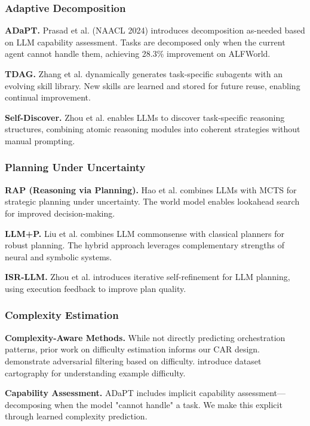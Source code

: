 \documentclass{article}
\theoremstyle{plain}
\theoremstyle{definition}
\theoremstyle{remark}
\begin{document}
\subsubsection{Adaptive Decomposition}

\textbf{ADaPT.} Prasad et al. \citep{prasad2024adapt} (NAACL 2024) introduces decomposition as-needed based on LLM capability assessment. Tasks are decomposed only when the current agent cannot handle them, achieving 28.3\% improvement on ALFWorld.

\textbf{TDAG.} Zhang et al. \citep{zhang2025tdag} dynamically generates task-specific subagents with an evolving skill library. New skills are learned and stored for future reuse, enabling continual improvement.

\textbf{Self-Discover.} Zhou et al. \citep{zhou2024selfdiscover} enables LLMs to discover task-specific reasoning structures, combining atomic reasoning modules into coherent strategies without manual prompting.

\subsubsection{Planning Under Uncertainty}

\textbf{RAP (Reasoning via Planning).} Hao et al. \citep{hao2023rap} combines LLMs with MCTS for strategic planning under uncertainty. The world model enables lookahead search for improved decision-making.

\textbf{LLM+P.} Liu et al. \citep{liu2023llmp} combines LLM commonsense with classical planners for robust planning. The hybrid approach leverages complementary strengths of neural and symbolic systems.

\textbf{ISR-LLM.} Zhou et al. \citep{zhou2024isr} introduces iterative self-refinement for LLM planning, using execution feedback to improve plan quality.

\subsubsection{Complexity Estimation}

\textbf{Complexity-Aware Methods.} While not directly predicting orchestration patterns, prior work on difficulty estimation informs our CAR design. \citet{sakaguchi2021winogrande} demonstrate adversarial filtering based on difficulty. \citet{swayamdipta2020dataset} introduce dataset cartography for understanding example difficulty.

\textbf{Capability Assessment.} ADaPT \citep{prasad2024adapt} includes implicit capability assessment---decomposing when the model "cannot handle" a task. We make this explicit through learned complexity prediction.
\end{document}
